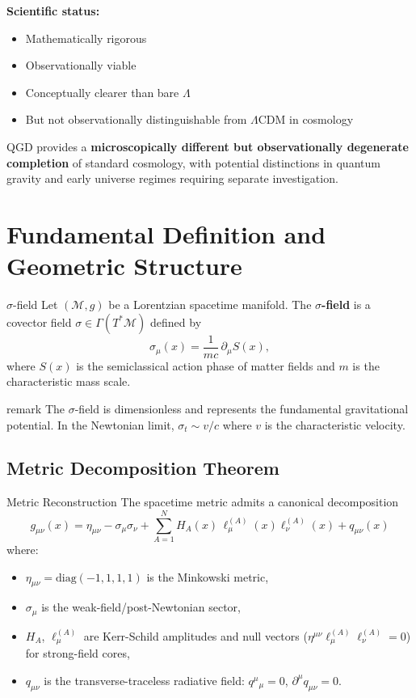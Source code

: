 \documentclass[11pt,a4paper]{article}
\theoremstyle{definition}
\theoremstyle{remark}
\begin{document}
	\textbf{Scientific status:}
	\begin{itemize}
		\item Mathematically rigorous
		\item Observationally viable
		\item Conceptually clearer than bare $\Lambda$
		\item But not observationally distinguishable from $\Lambda$CDM in cosmology
	\end{itemize}
	
	QGD provides a \textbf{microscopically different but observationally degenerate completion} of standard cosmology, with potential distinctions in quantum gravity and early universe regimes requiring separate investigation.
	
	\section{Fundamental Definition and Geometric Structure}
	
	$\sigma$-field
		Let $(\mathcal{M}, g)$ be a Lorentzian spacetime manifold. The \textbf{$\sigma$-field} is a covector field $\sigma \in \Gamma(T^*\mathcal{M})$ defined by
		\begin{equation}
			\sigma_\mu(x) = \frac{1}{mc} \, \partial_\mu S(x),
		\end{equation}
		where $S(x)$ is the semiclassical action phase of matter fields and $m$ is the characteristic mass scale.
	
	remark
		The $\sigma$-field is dimensionless and represents the fundamental gravitational potential. In the Newtonian limit, $\sigma_t \sim v/c$ where $v$ is the characteristic velocity.
	
	\subsection{Metric Decomposition Theorem}
	
	Metric Reconstruction
		The spacetime metric admits a canonical decomposition
		\begin{equation}
			\boxed{
				g_{\mu\nu}(x) = \eta_{\mu\nu} - \sigma_\mu \sigma_\nu + \sum_{A=1}^{N} H_A(x) \, \ell_\mu^{(A)}(x) \ell_\nu^{(A)}(x) + q_{\mu\nu}(x)
			}
		\end{equation}
		where:
		\begin{itemize}
			\item $\eta_{\mu\nu} = \text{diag}(-1,1,1,1)$ is the Minkowski metric,
			\item $\sigma_\mu$ is the weak-field/post-Newtonian sector,
			\item $H_A$, $\ell_\mu^{(A)}$ are Kerr-Schild amplitudes and null vectors ($\eta^{\mu\nu}\ell_\mu^{(A)}\ell_\nu^{(A)} = 0$) for strong-field cores,
			\item $q_{\mu\nu}$ is the transverse-traceless radiative field: $q^\mu{}_\mu = 0$, $\partial^\mu q_{\mu\nu} = 0$.
		\end{itemize}
	
\end{document}
